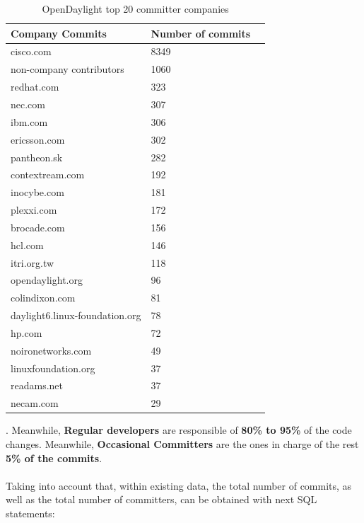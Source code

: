 \documentclass[a4paper, 12pt]{book}
\begin{document}
\begin{table}[H]
\footnotesize
\begin{center}
\begin{tabular}{|l|l|p{3cm}|}
\hline
\textbf{Company Commits} & \textbf{Number of commits} \\ \hline
cisco.com & 8349 \\ \hline
non-company contributors & 1060 \\ \hline
redhat.com & 323 \\ \hline
nec.com & 307 \\ \hline
ibm.com & 306 \\ \hline
ericsson.com & 302 \\ \hline
pantheon.sk & 282 \\ \hline
contextream.com & 192 \\ \hline
inocybe.com & 181 \\ \hline
plexxi.com & 172 \\ \hline
brocade.com & 156 \\ \hline
hcl.com & 146 \\ \hline
itri.org.tw & 118 \\ \hline
opendaylight.org & 96 \\ \hline
colindixon.com & 81 \\ \hline
daylight6.linux-foundation.org & 78 \\ \hline
hp.com & 72 \\ \hline
noironetworks.com & 49 \\ \hline
linuxfoundation.org & 37 \\ \hline
readams.net & 37 \\ \hline
necam.com & 29 \\ \hline
\end{tabular}
\end{center}
\caption{OpenDaylight top 20 committer companies}
\label{tab:odl_top_companies}
\end{table}
. Meanwhile, \textbf{Regular developers} are responsible of \textbf{80\% to 95\%} of the code changes. Meanwhile, \textbf{Occasional Committers} are the ones in charge of the rest \textbf{5\% of the commits}.\\
\\
Taking into account that, within existing data, the total number of commits, as well as the total number of committers, can be obtained with next SQL statements:
\end{document}
